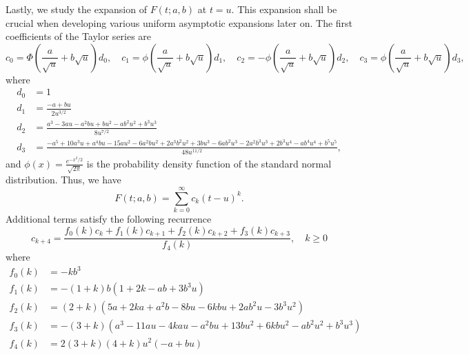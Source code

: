 \documentclass[10pt,a4paper,oneside]{article}
\numberwithin{equation}{section}
\begin{document}
Lastly, we study the expansion of $F(t;a,b)$ at $t=u$. This expansion shall be crucial when developing various uniform asymptotic expansions later on. The first coefficients of the Taylor series are
\begin{equation*}
c_0 = \Phi\left(\frac{a}{\sqrt{u}} + b\sqrt{u}\right)d_0,\quad c_1 = \phi\left(\frac{a}{\sqrt{u}} + b\sqrt{u}\right) d_1, \quad c_2 = -\phi\left(\frac{a}{\sqrt{u}} + b\sqrt{u}\right) d_2, \quad
c_3 = \phi\left(\frac{a}{\sqrt{u}} + b\sqrt{u}\right) d_3,
\end{equation*}
where
\begin{align*}
d_0 &= 1\\
d_1 &= \frac{-a + bu}{2u^{3/2}}\\
d_2 &=\frac{a^3 -3au -a^2 bu + bu^2 -ab^2 u^2 + b^3u^3}{8 u^{7/2}}\\
d_3 &= \frac{-a^5 +10a^3u + a^4bu -15au^2 - 6a^2bu^2 + 2a^3 b^2 u^2 +3bu^3 -6ab^2u^3 - 2a^2b^3 u^3 + 2b^3 u^4 -ab^4u^4 + b^5 u^5}{48 u^{11/2}},
\end{align*}
and $\phi(x) = \frac{e^{-x^2/2}}{\sqrt{2\pi}}$ is the probability density function of the standard normal distribution. Thus, we have
\begin{equation}\label{phi_expansion_at_u}
F(t; a, b) = \sum_{k=0}^{\infty} c_k (t-u)^k.
\end{equation}
Additional terms satisfy the following recurrence
\begin{equation}
c_{k+4} = \frac{f_0(k) c_k + f_1(k) c_{k+1} + f_2(k) c_{k+2} + f_3(k) c_{k+3}}{f_4(k)}, \quad k \ge 0
\end{equation}
where
\begin{align*}
f_0(k) &= -kb^3\\
f_1(k) &= -(1 + k) b (1 + 2k -ab + 3b^3u)\\
f_2(k) &= (2 + k)(5a + 2ka +a^2b - 8bu - 6kbu +2ab^2u -3b^3u^2)\\
f_3(k) &= -(3 + k)(a^3 - 11au -4kau - a^2bu + 13bu^2 + 6kbu^2 -ab^2u^2 + b^3 u^3)\\
f_4(k) &= 2 (3 + k) (4 + k) u^2 (-a + bu)
\end{align*}
\end{document}
